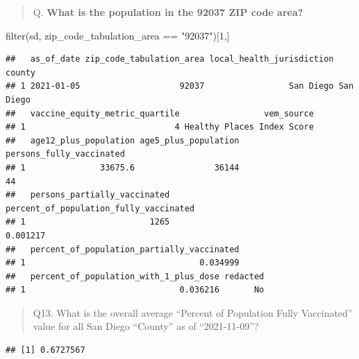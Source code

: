\documentclass[
]{article}
\newenvironment{Shaded}{\begin{snugshade}}{\end{snugshade}}
\newcommand{\AttributeTok}[1]{\textcolor[rgb]{0.77,0.63,0.00}{#1}}
\newcommand{\ConstantTok}[1]{\textcolor[rgb]{0.00,0.00,0.00}{#1}}
\newcommand{\DecValTok}[1]{\textcolor[rgb]{0.00,0.00,0.81}{#1}}
\newcommand{\FunctionTok}[1]{\textcolor[rgb]{0.00,0.00,0.00}{#1}}
\newcommand{\NormalTok}[1]{#1}
\newcommand{\OtherTok}[1]{\textcolor[rgb]{0.56,0.35,0.01}{#1}}
\newcommand{\SpecialCharTok}[1]{\textcolor[rgb]{0.00,0.00,0.00}{#1}}
\newcommand{\StringTok}[1]{\textcolor[rgb]{0.31,0.60,0.02}{#1}}
\begin{document}
\begin{quote}
Q. \textbf{What is the population in the 92037 ZIP code area?}
\end{quote}

\begin{Shaded}
\begin{Highlighting}[]
\FunctionTok{filter}\NormalTok{(sd, zip\_code\_tabulation\_area }\SpecialCharTok{==} \StringTok{"92037"}\NormalTok{)[}\DecValTok{1}\NormalTok{,]}
\end{Highlighting}
\end{Shaded}

\begin{verbatim}
##   as_of_date zip_code_tabulation_area local_health_jurisdiction    county
## 1 2021-01-05                    92037                 San Diego San Diego
##   vaccine_equity_metric_quartile                 vem_source
## 1                              4 Healthy Places Index Score
##   age12_plus_population age5_plus_population persons_fully_vaccinated
## 1               33675.6                36144                       44
##   persons_partially_vaccinated percent_of_population_fully_vaccinated
## 1                         1265                               0.001217
##   percent_of_population_partially_vaccinated
## 1                                   0.034999
##   percent_of_population_with_1_plus_dose redacted
## 1                               0.036216       No
\end{verbatim}

\begin{quote}
Q13. What is the overall average ``Percent of Population Fully
Vaccinated'' value for all San Diego ``County'' as of ``2021-11-09''?
\end{quote}

\begin{Shaded}
\end{Shaded}

\begin{verbatim}
## [1] 0.6727567
\end{verbatim}
\end{document}
